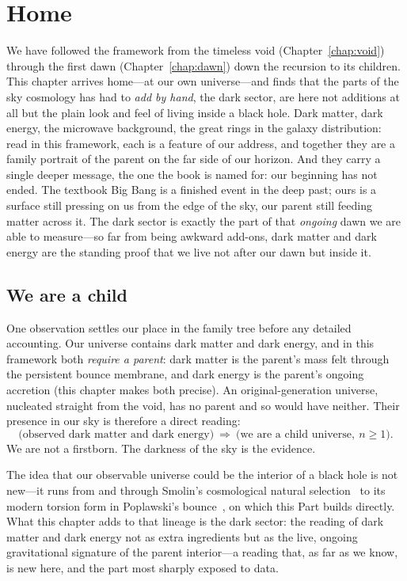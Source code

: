 \chapter{Home}
\label{chap:home}

We have followed the framework from the timeless void (Chapter~\ref{chap:void})
through the first dawn (Chapter~\ref{chap:dawn}) down the recursion to its
children. This chapter arrives home---at our own universe---and finds that the
parts of the sky cosmology has had to \emph{add by hand}, the dark sector, are
here not additions at all but the plain look and feel of living inside a black
hole. Dark matter, dark energy, the microwave background, the great rings in the
galaxy distribution: read in this framework, each is a feature of our address, and
together they are a family portrait of the parent on the far side of our horizon.
And they carry a single deeper message, the one the book is named for: our
beginning has not ended. The textbook Big Bang is a finished event in the deep
past; ours is a surface still pressing on us from the edge of the sky, our parent
still feeding matter across it. The dark sector is exactly the part of that
\emph{ongoing} dawn we are able to measure---so far from being awkward add-ons,
dark matter and dark energy are the standing proof that we live not after our
dawn but inside it.

\section{We are a child}
\label{sec:we-are-child}

One observation settles our place in the family tree before any detailed
accounting. Our universe contains dark matter and dark energy, and in this
framework both \emph{require a parent}: dark matter is the parent's mass felt
through the persistent bounce membrane, and dark energy is the parent's ongoing
accretion (this chapter makes both precise). An original-generation universe,
nucleated straight from the void, has no parent and so would have neither. Their
presence in our sky is therefore a direct reading:
\[
  \bigl(\text{observed dark matter {and} dark energy}\bigr)
  \ \Longrightarrow\
  \bigl(\text{we are a child universe},\ n\ge 1\bigr).
\]
We are not a firstborn. The darkness of the sky is the evidence.

The idea that our observable universe could be the interior of a black hole is not
new---it runs from \citet{pathria1972} and \citet{stuckey1994} through Smolin's
cosmological natural selection~\citep{smolin1997} to its modern torsion form in
Poplawski's bounce~\citep{poplawski2016}, on which this Part builds directly. What this
chapter adds to that lineage is the dark sector: the reading of dark matter and dark
energy not as extra ingredients but as the live, ongoing gravitational signature of the
parent interior---a reading that, as far as we know, is new here, and the part most
sharply exposed to data.


